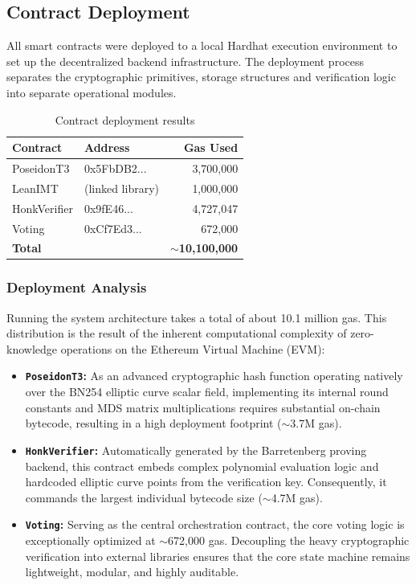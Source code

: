 \documentclass[12pt, a4paper]{report}
\begin{document}
\subsection{Contract Deployment}

All smart contracts were deployed to a local Hardhat execution environment to set up the decentralized backend infrastructure. The deployment process separates the cryptographic primitives, storage structures and verification logic into separate operational modules.

\begin{table}[H]
\centering
\caption{Contract deployment results}
\label{tab:deployment_results}
\begin{tabular}{|l|l|r|}
\hline
\textbf{Contract} & \textbf{Address} & \textbf{Gas Used} \\ \hline
PoseidonT3 & 0x5FbDB2...  & 3,700,000 \\ \hline
LeanIMT & (linked library) & 1,000,000 \\ \hline
HonkVerifier & 0x9fE46...  & 4,727,047 \\ \hline
Voting & 0xCf7Ed3...  & 672,000 \\ \hline
\textbf{Total} & & \textbf{$\sim$10,100,000} \\ \hline
\end{tabular}
\end{table}

\subsubsection*{Deployment Analysis}
Running the system architecture takes a total of about 10.1 million gas. This distribution is the result of the inherent computational complexity of zero-knowledge operations on the Ethereum Virtual Machine (EVM):
\begin{itemize}
    \item \textbf{\texttt{PoseidonT3}:} As an advanced cryptographic hash function operating natively over the BN254 elliptic curve scalar field, implementing its internal round constants and MDS matrix multiplications requires substantial on-chain bytecode, resulting in a high deployment footprint ($\sim$3.7M gas).
    \item \textbf{\texttt{HonkVerifier}:} Automatically generated by the Barretenberg proving backend, this contract embeds complex polynomial evaluation logic and hardcoded elliptic curve points from the verification key. Consequently, it commands the largest individual bytecode size ($\sim$4.7M gas).
    \item \textbf{\texttt{Voting}:} Serving as the central orchestration contract, the core voting logic is exceptionally optimized at $\sim$672,000 gas. Decoupling the heavy cryptographic verification into external libraries ensures that the core state machine remains lightweight, modular, and highly auditable.
\end{itemize}
\end{document}
